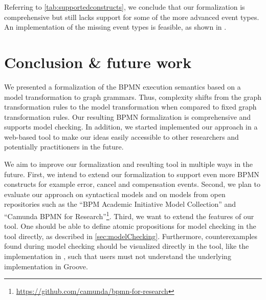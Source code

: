 \documentclass[submission, copyright, creativecommons]{eptcs}
\begin{document}
Referring to \cref{tab:supportedconstructs}, we conclude that our formalization is comprehensive but still lacks support for some of the more advanced event types.
An implementation of the missing event types is feasible, as shown in \cite{vangorpVisualTokenbasedFormalization2013}.

\section{Conclusion \& future work} \label{sec:conclusion}
We presented a formalization of the BPMN execution semantics based on a model transformation to graph grammars.
Thus, complexity shifts from the graph transformation rules to the model transformation when compared to fixed graph transformation rules.
Our resulting BPMN formalization is comprehensive and supports model checking.
In addition, we started implemented our approach in a web-based tool to make our ideas easily accessible to other researchers and potentially practitioners in the future.

We aim to improve our formalization and resulting tool in multiple ways in the future.
First, we intend to extend our formalization to support even more BPMN constructs for example error, cancel and compensation events.
Second, we plan to evaluate our approach on syntactical models and on models from open repositories such as the \enquote{BPM Academic Initiative Model Collection} \cite{weskeModelCollectionBusiness2020} and  \enquote{Camunda BPMN for
Research}\footnote{\url{https://github.com/camunda/bpmn-for-research}}.
Third, we want to extend the features of our tool.
One should be able to define atomic propositions for model checking in the tool directly, as described in \cref{sec:modelChecking}.
Furthermore, counterexamples found during model checking should be visualized directly in the tool, like the implementation in \cite{houhouFirstOrderLogicVerification2022}, such that users must not understand the underlying implementation in Groove.


\end{document}
